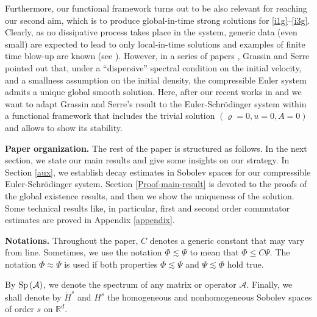 \documentclass[11pt,twoside]{amsart}
\newcommand{\A}{\mathcal{A}}
\begin{document}
 Furthermore, our functional framework turns out to be also relevant for 
 reaching our second aim, which is  to produce  global-in-time strong solutions for \eqref{i1g}--\eqref{i3g}. Clearly,  as no dissipative process takes place in the system,
generic data  (even small) are expected to lead to  only local-in-time 
solutions and examples of finite time blow-up are known  (see \cite{C,CW,R}).
  However, in a series of papers \cite{GS,G2,S}, Grassin and Serre  pointed out 
 that, under a  ``dispersive'' spectral  condition  on the initial velocity,
 and a smallness assumption on the initial density, the compressible Euler system admits a unique global smooth solution.  Here,  after our recent works in \cite{BDDN} and \cite{DD} 
 we want to adapt  Grassin and Serre's result  to the Euler-Schr\"odinger system 
 within a functional framework that includes the trivial solution $(\varrho=0, u=0, A=0)$
 and allows to show  its stability. 



\medbreak

{\bf Paper organization.} The rest of the paper is structured as follows. 
In the next section, we state our main results and give some insights on our strategy. 
In Section \ref{aux}, we establish decay estimates in Sobolev spaces for our  compressible Euler-Schr\"{o}dinger system. 
Section \ref{Proof-main-result} is devoted to the proofs of  the global existence 
results, and then we show the uniqueness of the solution.
Some technical results like, in particular, first and second order commutator 
estimates are proved in Appendix \ref{appendix}. 

\medbreak

{\bf Notations.} Throughout the paper, $C$ denotes a generic  constant that may vary from line.
Sometimes, we use  the notation $\Phi\lesssim \Psi$ to mean that 
$\Phi\leq C\Psi.$  The notation $\Phi\approx \Psi$  is used if  both properties $\Phi\lesssim \Psi$ and $\Psi\lesssim \Phi$ hold true. 

By ${\rm Sp}\,(\A)$, we  denote the spectrum of any matrix or operator $\A.$  Finally, we shall denote by $\dot H^s$ and $H^s$ the homogeneous and nonhomogeneous Sobolev
spaces of order $s$ on $\mathbb R^d$. 

 
\end{document}
